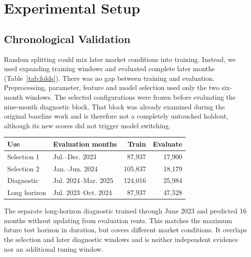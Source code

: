 \documentclass[conference]{IEEEtran}
\makeatletter
\newenvironment{localtable}{\par\addvspace{\medskipamount}\noindent
  \begin{minipage}{\columnwidth}\def\@captype{table}}{\end{minipage}\par
  \addvspace{\medskipamount}}
\makeatother
\begin{document}
\section{Experimental Setup}
\label{sec:experiments}

\subsection{Chronological Validation}
Random splitting could mix later market conditions into training. Instead,
we used expanding training windows and evaluated complete later months
(Table~\ref{tab:folds}). There was no gap between training and evaluation.
Preprocessing, parameter, feature and model selection used only the two
six-month windows. The selected configurations were frozen before evaluating
the nine-month diagnostic block. That block was already examined during
the original baseline work and is therefore not a completely untouched
holdout, although its new scores did not trigger model switching.

\begin{localtable}
  \caption{Chronological evaluation. Counts refer to original labelled records.}
  \label{tab:folds}
  \centering\small
  \begin{tabularx}{\columnwidth}{lXrr}
    \toprule
    Use & Evaluation months & Train & Evaluate \\
    \midrule
    Selection 1 & Jul.--Dec. 2023 & 87,937 & 17,900 \\
    Selection 2 & Jan.--Jun. 2024 & 105,837 & 18,179 \\
    Diagnostic & Jul. 2024--Mar. 2025 & 124,016 & 25,984 \\
    Long horizon & Jul. 2023--Oct. 2024 & 87,937 & 47,528 \\
    \bottomrule
  \end{tabularx}
\end{localtable}

The separate long-horizon diagnostic trained through June 2023 and predicted
16 months without updating from evaluation rents. This matches the maximum
future test horizon in duration, but covers different market conditions.
It overlaps the selection and later diagnostic windows and is neither
independent evidence nor an additional tuning window.
\end{document}
